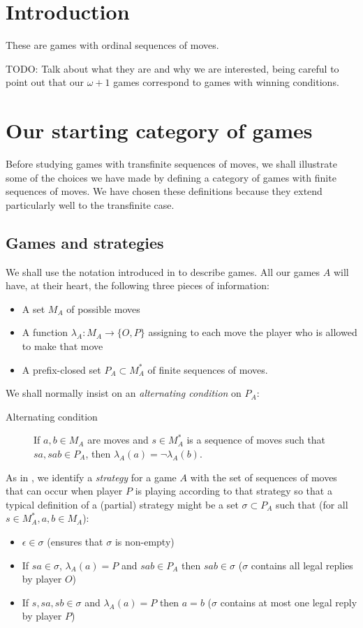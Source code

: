 \documentclass[11pt]{article} %
\theoremstyle{plain} %
\theoremstyle{definition} %
\theoremstyle{exercisestyle}
\newcommand*\from{\colon}
\newcommand{\cmap}[3]{#1\from{}#2\to{}#3}
\newcommand{\OP}{\{O,P\}}
\newcommand{\emptyplay}{\epsilon}
\begin{document}
\section{Introduction}

These are games with ordinal sequences of moves.

TODO: Talk about what they are and why we are interested, being careful to point out that our $\omega+1$ games correspond to games with winning conditions.

\section{Our starting category of games}

Before studying games with transfinite sequences of moves, we shall illustrate some of the choices we have made by defining a category of games with finite sequences of moves.  We have chosen these definitions because they extend particularly well to the transfinite case.  

\subsection{Games and strategies}

We shall use the notation introduced in \cite{abramskyjagadeesangames} to describe games.  All our games $A$ will have, at their heart, the following three pieces of information:
\begin{itemize}
  \item A set $M_A$ of possible moves
  \item A function $\cmap{\lambda_A}{M_A}{\OP}$ assigning to each move the player who is allowed to make that move
  \item A prefix-closed set $P_A\subset M_A^*$ of finite sequences of moves.
\end{itemize}
We shall normally insist on an \emph{alternating condition} on $P_A$:
\begin{description}
  \item[Alternating condition] If $a,b\in M_A$ are moves and $s\in M_A^*$ is a sequence of moves such that $sa, sab\in P_A$, then $\lambda_A(a)=\neg\lambda_A(b)$.
\end{description}

As in \cite{abramskyjagadeesangames}, we identify a \emph{strategy} for a game $A$ with the set of sequences of moves that can occur when player $P$ is playing according to that strategy so that a typical definition of a (partial) strategy might be a set $\sigma\subset P_A$ such that (for all $s\in M_A^*, a,b\in M_A$):
\begin{itemize}
  \item $\emptyplay\in\sigma$ (ensures that $\sigma$ is non-empty)
  \item If $sa\in\sigma$, $\lambda_A(a)=P$ and $sab\in P_A$ then $sab\in\sigma$ ($\sigma$ contains all legal replies by player $O$)
  \item If $s,sa,sb\in\sigma$ and $\lambda_A(a)=P$ then $a=b$ ($\sigma$ contains at most one legal reply by player $P$)
\end{itemize}
\end{document}
